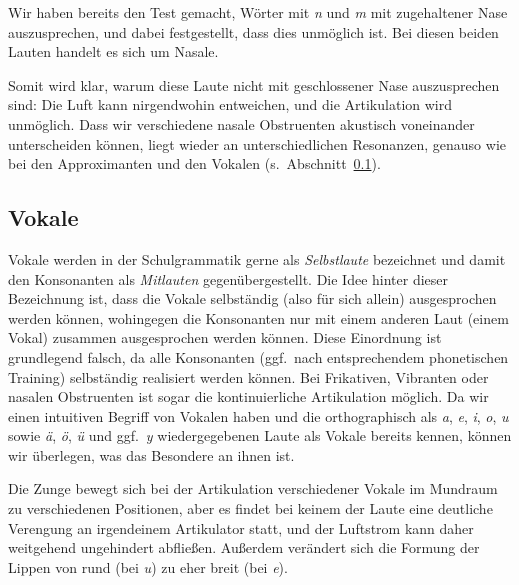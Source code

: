 Wir haben bereits den Test gemacht, Wörter mit \textit{n} und \textit{m} mit zugehaltener Nase auszusprechen, und dabei festgestellt, dass dies unmöglich ist.
Bei diesen beiden Lauten handelt es sich um Nasale.


Somit wird klar, warum diese Laute nicht mit geschlossener Nase auszusprechen sind:
Die Luft kann nirgendwohin entweichen, und die Artikulation wird unmöglich.
Dass wir verschiedene nasale Obstruenten akustisch voneinander unterscheiden können, liegt wieder an unterschiedlichen Resonanzen, genauso wie bei den Approximanten und den Vokalen (s.\ Abschnitt~\ref{sec:vokale}).

\subsection{Vokale}

\label{sec:vokale}

Vokale werden in der Schulgrammatik gerne als \textit{Selbstlaute} bezeichnet und damit den Konsonanten als \textit{Mitlauten} gegenübergestellt.
Die Idee hinter dieser Bezeichnung ist, dass die Vokale selbständig (also für sich allein) ausgesprochen werden können, wohingegen die Konsonanten nur mit einem anderen Laut (einem Vokal) zusammen ausgesprochen werden können.
Diese Einordnung ist grundlegend falsch, da alle Konsonanten (ggf.\ nach entsprechendem phonetischen Training) selbständig realisiert werden können.
Bei Frikativen, Vibranten oder nasalen Obstruenten ist sogar die kontinuierliche Artikulation möglich.
Da wir einen intuitiven Begriff von Vokalen haben und die orthographisch als \textit{a}, \textit{e}, \textit{i}, \textit{o}, \textit{u} sowie \textit{ä}, \textit{ö}, \textit{ü} und ggf.\ \textit{y} wiedergegebenen Laute als Vokale bereits kennen, können wir überlegen, was das Besondere an ihnen ist.


Die Zunge bewegt sich bei der Artikulation verschiedener Vokale im Mund\-raum zu verschiedenen Positionen, aber es findet bei keinem der Laute eine deutliche Verengung an irgendeinem Artikulator statt, und der Luftstrom kann daher weitgehend ungehindert abfließen.
Außerdem verändert sich die Formung der Lippen von rund (\zB bei \textit{u}) zu eher breit (\zB bei \textit{e}).

